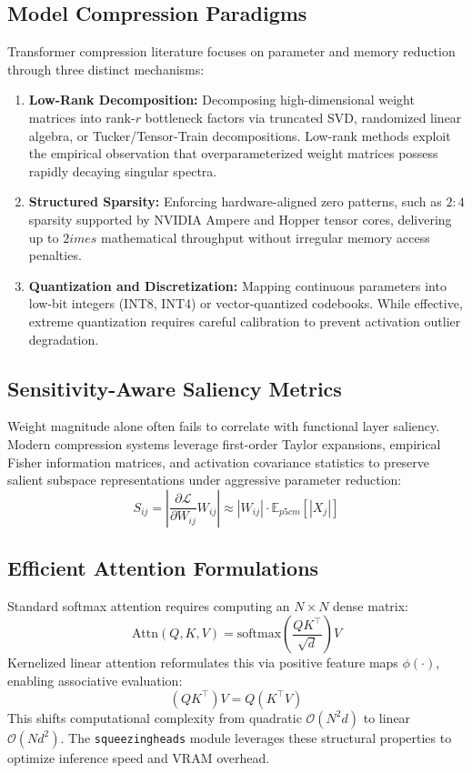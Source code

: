 \subsection{Model Compression Paradigms}
Transformer compression literature focuses on parameter and memory reduction through three distinct mechanisms:
\begin{enumerate}
\item \textbf{Low-Rank Decomposition:} Decomposing high-dimensional weight matrices into rank-$r$ bottleneck factors via truncated SVD, randomized linear algebra, or Tucker/Tensor-Train decompositions. Low-rank methods exploit the empirical observation that overparameterized weight matrices possess rapidly decaying singular spectra.
\item \textbf{Structured Sparsity:} Enforcing hardware-aligned zero patterns, such as $2:4$ sparsity supported by NVIDIA Ampere and Hopper tensor cores, delivering up to $2	imes$ mathematical throughput without irregular memory access penalties.
\item \textbf{Quantization and Discretization:} Mapping continuous parameters into low-bit integers (INT8, INT4) or vector-quantized codebooks. While effective, extreme quantization requires careful calibration to prevent activation outlier degradation.
\end{enumerate}

\subsection{Sensitivity-Aware Saliency Metrics}
Weight magnitude alone often fails to correlate with functional layer saliency. Modern compression systems leverage first-order Taylor expansions, empirical Fisher information matrices, and activation covariance statistics to preserve salient subspace representations under aggressive parameter reduction:
\[
S_{ij} = \left| \frac{\partial \mathcal{L}}{\partial W_{ij}} W_{ij} \right| \approx |W_{ij}| \cdot \mathbb{E}_{p{5cm}}[|X_j|]
\]

\subsection{Efficient Attention Formulations}
Standard softmax attention requires computing an $N \times N$ dense matrix:
\[
\text{Attn}(Q, K, V) = \text{softmax}\left(\frac{Q K^\top}{\sqrt{d}}\right) V
\]
Kernelized linear attention reformulates this via positive feature maps $\phi(\cdot)$, enabling associative evaluation:
\[
(Q K^\top) V = Q (K^\top V)
\]
This shifts computational complexity from quadratic $\mathcal{O}(N^2 d)$ to linear $\mathcal{O}(N d^2)$. The \texttt{squeezingheads} module leverages these structural properties to optimize inference speed and VRAM overhead.


